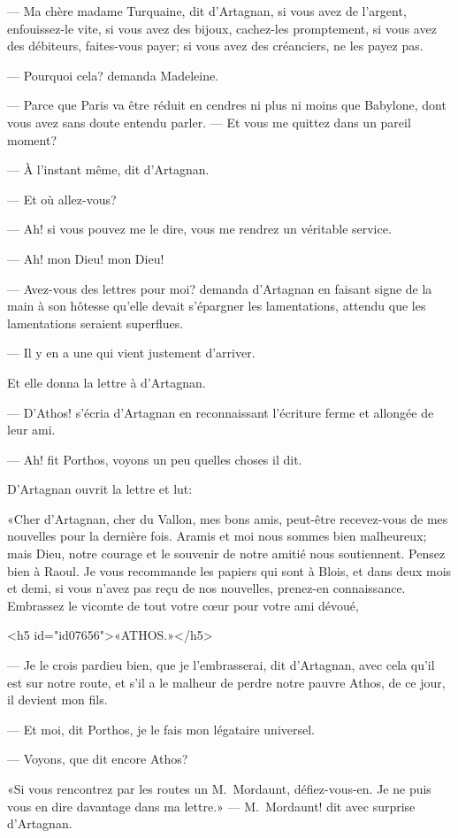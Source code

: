 — Ma chère madame Turquaine, dit d'Artagnan, si vous avez de l'argent, enfouissez-le vite, si vous avez des bijoux, cachez-les promptement, si vous avez des débiteurs, faites-vous payer; si vous avez des créanciers, ne les payez pas.

— Pourquoi cela? demanda Madeleine.

— Parce que Paris va être réduit en cendres ni plus ni moins que Babylone, dont vous avez sans doute entendu parler.
— Et vous me quittez dans un pareil moment?

— À l'instant même, dit d'Artagnan.

— Et où allez-vous?

— Ah! si vous pouvez me le dire, vous me rendrez un véritable service.

— Ah! mon Dieu! mon Dieu!

— Avez-vous des lettres pour moi? demanda d'Artagnan en faisant signe de la main à son hôtesse qu'elle devait s'épargner les lamentations, attendu que les lamentations seraient superflues.

— Il y en a une qui vient justement d'arriver.

Et elle donna la lettre à d'Artagnan.

— D'Athos! s'écria d'Artagnan en reconnaissant l'écriture ferme et allongée de leur ami.

— Ah! fit Porthos, voyons un peu quelles choses il dit.

D'Artagnan ouvrit la lettre et lut:

«Cher d'Artagnan, cher du Vallon, mes bons amis, peut-être recevez-vous de mes nouvelles pour la dernière fois. Aramis et moi nous sommes bien malheureux; mais Dieu, notre courage et le souvenir de notre amitié nous soutiennent. Pensez bien à Raoul. Je vous recommande les papiers qui sont à Blois, et dans deux mois et demi, si vous n'avez pas reçu de nos nouvelles, prenez-en connaissance. Embrassez le vicomte de tout votre cœur pour votre ami dévoué,

<h5 id="id07656">«ATHOS.»</h5>

— Je le crois pardieu bien, que je l'embrasserai, dit d'Artagnan, avec cela qu'il est sur notre route, et s'il a le malheur de perdre notre pauvre Athos, de ce jour, il devient mon fils.

— Et moi, dit Porthos, je le fais mon légataire universel.

— Voyons, que dit encore Athos?

«Si vous rencontrez par les routes un M.~Mordaunt, défiez-vous-en. Je ne puis vous en dire davantage dans ma lettre.»
— M.~Mordaunt! dit avec surprise d'Artagnan.


